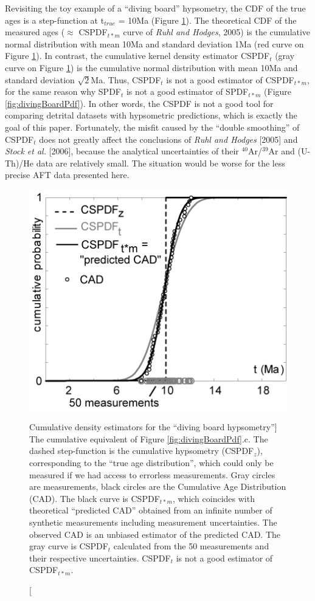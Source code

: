 \documentclass[12pt,twoside]{article}
\begin{document}
Revisiting the toy  example of a ``diving board''  hypsometry, the CDF
of  the true  ages is  a step-function  at t$_{true}$  =  10Ma (Figure
\ref{fig:cspdf50}).   The   theoretical  CDF  of   the  measured  ages
($\approx$ CSPDF$_{t*m}$ curve of {\it  Ruhl and Hodges}, 2005) is the
cumulative normal  distribution with mean 10Ma  and standard deviation
1Ma  (red  curve  on  Figure  \ref{fig:cspdf50}).   In  contrast,  the
cumulative kernel  density estimator  CSPDF$_t$ (gray curve  on Figure
\ref{fig:cspdf50})  is the  cumulative normal  distribution  with mean
10Ma  and standard deviation  $\sqrt{2}$Ma. Thus,  CSPDF$_t$ is  not a
good estimator of  CSPDF$_{t*m}$, for the same reason  why SPDF$_t$ is
not     a      good     estimator     of      SPDF$_{t*m}$     (Figure
\ref{fig:divingBoardPdf}).  In  other words, the  CSPDF is not  a good
tool  for comparing  detrital datasets  with  hypsometric predictions,
which  is exactly  the goal  of this  paper.  Fortunately,  the misfit
caused  by the  ``double  smoothing'' of  CSPDF$_t$  does not  greatly
affect the conclusions of {\it  Ruhl and Hodges} [2005] and {\it Stock
  et  al.}   [2006], because  the  analytical  uncertainties of  their
$^{40}$Ar/$^{39}$Ar  and  (U-Th)/He data  are  relatively small.   The
situation would be worse for the less precise AFT data presented here.
\\

\begin{figure}[][h]
\centering \includegraphics[width=.5\textwidth]{fig5.jpg}
\caption
[Cumulative density estimators for  the ``diving board hypsometry''] {
  The cumulative equivalent of Figure \ref{fig:divingBoardPdf}.c.  The
  dashed  step-function is  the  cumulative hypsometry  (CSPDF$_{z}$),
  corresponding to the ``true  age distribution'', which could only be
  measured if  we had access to errorless  measurements.  Gray circles
  are measurements, black circles  are the Cumulative Age Distribution
  (CAD).   The  black curve  is  CSPDF$_{t*m}$,  which coincides  with
  theoretical ``predicted  CAD'' obtained  from an infinite  number of
  synthetic  measurements  including  measurement uncertainties.   The
  observed CAD  is an  unbiased estimator of  the predicted  CAD.  The
  gray curve  is CSPDF$_{t}$ calculated  from the 50  measurements and
  their respective uncertainties.  CSPDF$_{t}$ is not a good estimator
  of CSPDF$_{t*m}$.  }
  \label{fig:cspdf50}
\end{figure}
\end{document}
